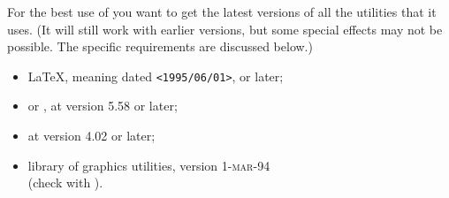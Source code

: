 \medskip\noindent
For the best use of \latextohtml{} you want to get the latest
versions of all the utilities that it uses. (It will still work
with earlier versions, but some  special effects may not be possible.
The specific requirements are discussed below.)
%
\begin{itemize}

\item \LaTeX, meaning \LaTeXe{} dated \texttt{<1995/06/01>}, or later;
\item {} or , at version 5.58 or later;
\item {} at version 4.02 or later;
\item {} library of graphics utilities, version \textsc{1-mar-94}\\
  (check with  ).
\end{itemize}

